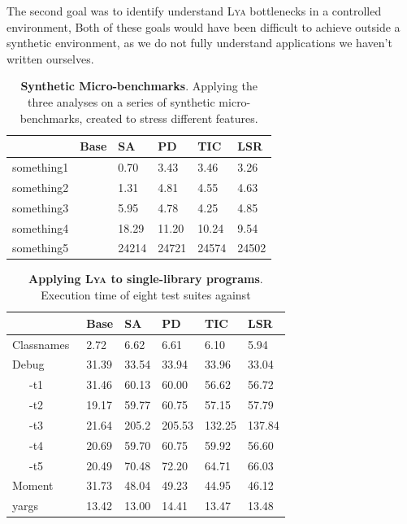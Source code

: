 \documentclass[letterpaper,twocolumn,10pt]{article}
\newcommand{\sys}{{\scshape Lya}\xspace}
\newcommand{\fixme}[1]{{\color{red}#1}}
\begin{document}
The second goal was to identify understand \sys bottlenecks in a controlled environment, 
Both of these goals would have been difficult to achieve outside a synthetic environment, as we do not fully understand applications we haven't written ourselves.

\begin{table}[t]
\center
\footnotesize
\setlength\tabcolsep{3pt}
\caption{
  \footnotesize{
    \textbf{Synthetic Micro-benchmarks}.
		Applying the three analyses on a series of synthetic micro-benchmarks, created to stress different features.
  }
}
\begin{tabular*}{\columnwidth}{l @{\extracolsep{\fill}} ll lll}
\toprule
              &   Base    &  SA     & PD       &   TIC    &   LSR     \\
\midrule
something1    &           &  0.70   &    3.43  &   3.46   &   3.26    \\
something2    &           &  1.31   &    4.81  &   4.55   &   4.63    \\
something3    &           &  5.95   &    4.78  &   4.25   &   4.85    \\
something4    &           &  18.29  &   11.20  &   10.24  &   9.54    \\
something5    &           &  24214  &   24721  &   24574  &   24502   \\
\bottomrule
\end{tabular*}
\label{tab:synthetic}
\vspace{-5mm}
\end{table}

\begin{table}[t]
\center
\footnotesize
\setlength\tabcolsep{3pt}
\caption{
  \footnotesize{
    \textbf{Applying \sys to single-library programs}.
		\fixme{Execution time of eight test suites against }
  }
}
\begin{tabular*}{\columnwidth}{l @{\extracolsep{\fill}} ll lll}
\toprule
                    & Base   &  SA   & PD     &   TIC   & LSR     \\
\midrule
Classnames~\cite{}  &  2.72  & 6.62  &  6.61  &  6.10   & 5.94    \\
Debug~\cite{}       & 31.39  & 33.54 &  33.94 &  33.96  & 33.04   \\
~~~-t1              & 31.46  & 60.13 &  60.00 &  56.62  & 56.72   \\
~~~-t2              & 19.17  & 59.77 &  60.75 &  57.15  & 57.79   \\
~~~-t3              & 21.64  & 205.2 &  205.53&  132.25 & 137.84  \\
~~~-t4              & 20.69  & 59.70 &  60.75 &  59.92  & 56.60   \\
~~~-t5              & 20.49  & 70.48 &  72.20 &  64.71  & 66.03   \\
Moment~\cite{}      & 31.73  & 48.04 &  49.23 &  44.95  & 46.12   \\
yargs~\cite{}       & 13.42  & 13.00 &  14.41 &  13.47  & 13.48   \\
\bottomrule
\end{tabular*}
\label{tab:meso}
\vspace{-5mm}
\end{table}
\end{document}
